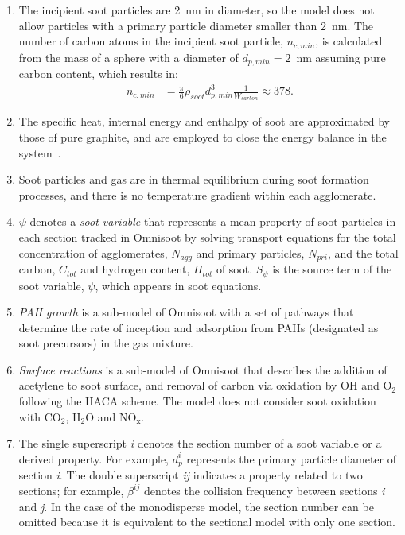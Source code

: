 \begin{enumerate}
	\item The incipient soot particles are 2~nm in diameter, so the model does not allow particles with a primary particle diameter smaller than 2~nm. The number of carbon atoms in the incipient soot particle, $n_{c,min}$, is calculated from the mass of a sphere with a diameter of $d_{p,min}=2$~nm assuming pure carbon content, which results in:
	\begin{equation}
		\begin{split}
			n_{c,min}& =\frac{\pi}{6}\rho_{soot}d^3_{p,min}\frac{1}{W_{carbon}}\approx378.
			\label{eqn:nc_min}
		\end{split}
	\end{equation}
	
	
	\item The specific heat, internal energy and enthalpy of soot are approximated by those of pure graphite, and are employed to close the energy balance in the system~\cite{mcbride1993coefficients}.
	
	\item Soot particles and gas are in thermal equilibrium during soot formation processes, and there is no temperature gradient within each agglomerate.
	
	
	\item $\psi$ denotes a \textit{soot variable} that represents a mean property of soot particles in each section tracked in Omnisoot by solving transport equations for the total concentration of agglomerates, $N_{agg}$ and primary particles, $N_{pri}$, and the total carbon, $C_{tot}$ and hydrogen content, $H_{tot}$ of soot. $S_{\psi}$ is the source term of the soot variable, $\psi$, which appears in soot equations.  
	
	\item \textit{PAH growth} is a sub-model of Omnisoot with a set of pathways that determine the rate of inception and adsorption from PAHs (designated as soot precursors) in the gas mixture.
	
	\item \textit{Surface reactions} is a sub-model of Omnisoot that describes the addition of acetylene to soot surface, and removal of carbon via oxidation by OH and $\mathrm{O_2}$ following the HACA scheme. The model does not consider soot oxidation with $\mathrm{CO_2}$, $\mathrm{H_2O}$ and $\mathrm{NO_x}$.
	
	\item The single superscript \textit{i} denotes the section number of a soot variable or a derived property. For example, $d^i_p$ represents the primary particle diameter of section \textit{i}. The double superscript \textit{ij} indicates a property related to two sections; for example, $\beta^{ij}$ denotes the collision frequency between sections \textit{i} and \textit{j}. In the case of the monodisperse model, the section number can be omitted because it is equivalent to the sectional model with only one section.
	

\end{enumerate}
